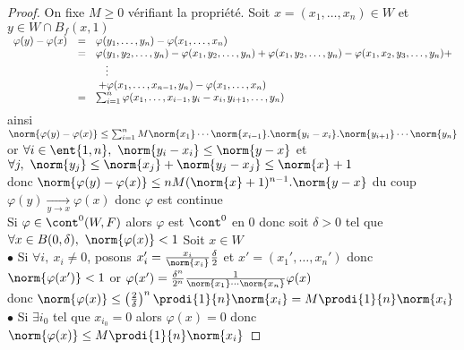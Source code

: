 		\begin{proof}
		\fbox{$\Leftarrow$} On fixe $M\geq 0$ vérifiant la propriété. Soit $x=(x_1 ,\dots ,x_n)\in W$ et $y\in W\cap B_f(x,1)$\\
		$\begin{array}{ll}
		\varphi (y) - \varphi (x) & =~~\varphi (y_1 ,\dots , y_n) - \varphi (x_1 ,\dots , x_n) \\ &=~~\varphi (y_1 ,y_2,\dots , y_n) - 
		\varphi (x_1,y_2 ,\dots , y_n) + \varphi (x_1,y_2 ,\dots , y_n) - \varphi (x_1,x_2,y_3,\dots ,y_n) + \\ &~~~~~~~~\vdots \\ &~~~~~~+
		\varphi (x_1 ,\dots ,x_{n-1}, y_n) - \varphi (x_1 ,\dots , x_n) \\
		&=~~\sum_{i=1}^n \varphi (x_1,\dots ,x_{i-1} , y_i - x_i ,y_{i+1},\dots , y_n) \vspace*{0.2cm} \end{array}$\\
		ainsi $\norm{\varphi (y) - \varphi (x)} \leq \sum_{i=1}^n M \norm{x_1}\cdots\norm{x_{i-1}}.\norm{y_i - x_i}.\norm{y_{i+1}}\cdots\norm{y_n}$
		\vspace{0.2cm}\\or $\forall i\in \ent{1,n} ,~ \norm{y_i-x_i} \leq \norm{y-x}$ et $\forall j ,~\norm{y_j} \leq \norm{x_j} + \norm{y_j - x_j} 
		\leq \norm{x} + 1$ \vspace*{0.2cm}\\donc $\norm{\varphi (y) - \varphi (x)} \leq nM(\norm{x} + 1)^{n-1} .\norm{y-x}$ du coup $\varphi (y) 
		\underset{y\rightarrow x}{\longrightarrow} \varphi (x)$ donc $\varphi$ est continue \vspace*{0.2cm}\\ 
		\fbox{$\Rightarrow$} Si $\varphi \in\cont^0(W,F)$ alors $\varphi$ est $\cont^0$ en $0$ donc soit $\delta>0$ tel que 
		$\forall x\in B(0,\delta ) ,~\norm{\varphi (x)} <1$ Soit $x\in W$\\
		$\bullet$ Si $\forall i , ~x_i \neq 0$, posons $x_i' = \frac{x_i}{\norm{x_i}}\frac{\delta}{2}$ et $x' = (x_1',\dots ,x_n')$ donc 
		$\norm{\varphi (x')} <1$ or $\varphi (x') = \frac{\delta^n}{2^n}\frac{1}{\norm{x_1}\cdots\norm{x_n}} \varphi (x)$ \\
		donc $\norm{\varphi (x) } \leq \left(\frac{2}{\delta}\right)^n \prodi{1}{n} \norm{x_i} = M \prodi{1}{n} \norm{x_i}$ \\
		$\bullet$ Si $\exists i_0$ tel que $x_{i_0} =0$ alors $\varphi (x) = 0$ donc $\norm{\varphi (x)} \leq M\prodi{1}{n} \norm{x_i}$
		\end{proof}

